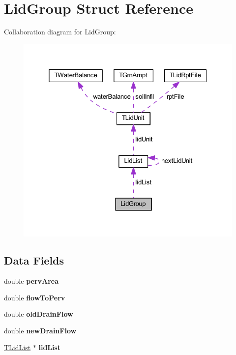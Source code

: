 \hypertarget{struct_lid_group}{}\section{Lid\+Group Struct Reference}
\label{struct_lid_group}


Collaboration diagram for Lid\+Group\+:
\nopagebreak
\begin{figure}[H]
\begin{center}
\leavevmode
\includegraphics[width=325pt]{d8/d73/struct_lid_group__coll__graph}
\end{center}
\end{figure}
\subsection*{Data Fields}
\begin{DoxyCompactItemize}
\item 
\mbox{\label{struct_lid_group_a8860aa179f06103a9484a3c690cc4f20}} 
double {\bfseries perv\+Area}
\item 
\mbox{\label{struct_lid_group_aa110a1da5deea1bb1e6ae0ecf10c8743}} 
double {\bfseries flow\+To\+Perv}
\item 
\mbox{\label{struct_lid_group_a24f8dff09a2cb2fc68d10cb35fa93a29}} 
double {\bfseries old\+Drain\+Flow}
\item 
\mbox{\label{struct_lid_group_afb8b4ef818385f679a9df91120b00f2b}} 
double {\bfseries new\+Drain\+Flow}
\item 
\mbox{\label{struct_lid_group_a0e74bcefa6d2e5bd2f4188fe0ce4827c}} 
\hyperlink{struct_lid_list}{T\+Lid\+List} $\ast$ {\bfseries lid\+List}
\end{DoxyCompactItemize}


